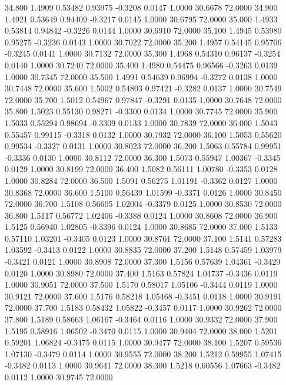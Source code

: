   34.800   1.4909   0.53482   0.93975  -0.3208   0.0147   1.0000  30.6678  72.0000
  34.900   1.4921   0.53649   0.94409  -0.3217   0.0145   1.0000  30.6795  72.0000
  35.000   1.4933   0.53814   0.94842  -0.3226   0.0144   1.0000  30.6910  72.0000
  35.100   1.4945   0.53980   0.95275  -0.3236   0.0143   1.0000  30.7022  72.0000
  35.200   1.4957   0.54145   0.95706  -0.3245   0.0141   1.0000  30.7132  72.0000
  35.300   1.4968   0.54310   0.96137  -0.3254   0.0140   1.0000  30.7240  72.0000
  35.400   1.4980   0.54475   0.96566  -0.3263   0.0139   1.0000  30.7345  72.0000
  35.500   1.4991   0.54639   0.96994  -0.3272   0.0138   1.0000  30.7448  72.0000
  35.600   1.5002   0.54803   0.97421  -0.3282   0.0137   1.0000  30.7549  72.0000
  35.700   1.5012   0.54967   0.97847  -0.3291   0.0135   1.0000  30.7648  72.0000
  35.800   1.5023   0.55130   0.98271  -0.3300   0.0134   1.0000  30.7745  72.0000
  35.900   1.5033   0.55294   0.98694  -0.3309   0.0133   1.0000  30.7839  72.0000
  36.000   1.5043   0.55457   0.99115  -0.3318   0.0132   1.0000  30.7932  72.0000
  36.100   1.5053   0.55620   0.99534  -0.3327   0.0131   1.0000  30.8023  72.0000
  36.200   1.5063   0.55784   0.99951  -0.3336   0.0130   1.0000  30.8112  72.0000
  36.300   1.5073   0.55947   1.00367  -0.3345   0.0129   1.0000  30.8199  72.0000
  36.400   1.5082   0.56111   1.00780  -0.3353   0.0128   1.0000  30.8284  72.0000
  36.500   1.5091   0.56275   1.01191  -0.3362   0.0127   1.0000  30.8368  72.0000
  36.600   1.5100   0.56439   1.01599  -0.3371   0.0126   1.0000  30.8450  72.0000
  36.700   1.5108   0.56605   1.02004  -0.3379   0.0125   1.0000  30.8530  72.0000
  36.800   1.5117   0.56772   1.02406  -0.3388   0.0124   1.0000  30.8608  72.0000
  36.900   1.5125   0.56940   1.02805  -0.3396   0.0124   1.0000  30.8685  72.0000
  37.000   1.5133   0.57110   1.03201  -0.3405   0.0123   1.0000  30.8761  72.0000
  37.100   1.5141   0.57283   1.03592  -0.3413   0.0122   1.0000  30.8835  72.0000
  37.200   1.5148   0.57459   1.03979  -0.3421   0.0121   1.0000  30.8908  72.0000
  37.300   1.5156   0.57639   1.04361  -0.3429   0.0120   1.0000  30.8980  72.0000
  37.400   1.5163   0.57824   1.04737  -0.3436   0.0119   1.0000  30.9051  72.0000
  37.500   1.5170   0.58017   1.05106  -0.3444   0.0119   1.0000  30.9121  72.0000
  37.600   1.5176   0.58218   1.05468  -0.3451   0.0118   1.0000  30.9191  72.0000
  37.700   1.5183   0.58432   1.05822  -0.3457   0.0117   1.0000  30.9262  72.0000
  37.800   1.5189   0.58663   1.06167  -0.3464   0.0116   1.0000  30.9332  72.0000
  37.900   1.5195   0.58916   1.06502  -0.3470   0.0115   1.0000  30.9404  72.0000
  38.000   1.5201   0.59201   1.06824  -0.3475   0.0115   1.0000  30.9477  72.0000
  38.100   1.5207   0.59536   1.07130  -0.3479   0.0114   1.0000  30.9555  72.0000
  38.200   1.5212   0.59955   1.07415  -0.3482   0.0113   1.0000  30.9641  72.0000
  38.300   1.5218   0.60556   1.07663  -0.3482   0.0112   1.0000  30.9745  72.0000
